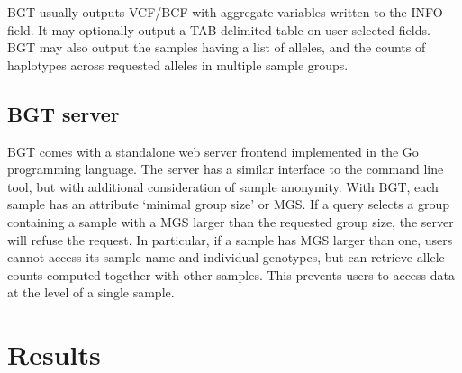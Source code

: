 \documentclass{bioinfo}
\begin{document}
\begin{methods}
BGT usually outputs VCF/BCF with aggregate variables written to the INFO field.
It may optionally output a TAB-delimited table on user selected fields. BGT
may also output the samples having a list of alleles, and the counts of
haplotypes across requested alleles in multiple sample groups.

%

\subsection{BGT server}

BGT comes with a standalone web server frontend implemented in the Go
programming language. The server has a similar interface to the command line
tool, but with additional consideration of sample anonymity. With BGT,
each sample has an attribute `minimal group size' or MGS. If a query selects a
group containing a sample with a MGS larger than the requested group size, the
server will refuse the request. In particular, if a sample has MGS larger than
one, users cannot access its sample name and individual genotypes, but can
retrieve allele counts computed together with other samples. This prevents
users to access data at the level of a single sample.

\end{methods}

\section{Results}
\end{document}
